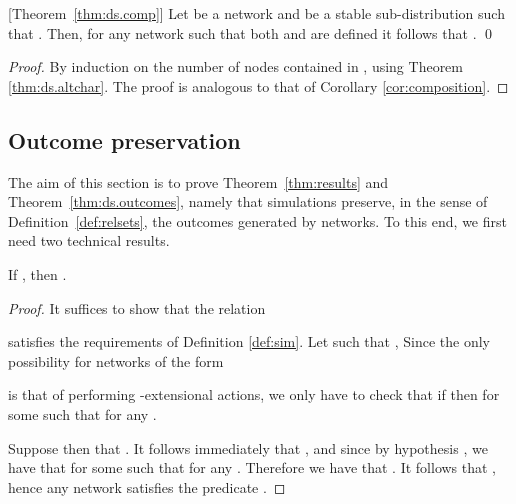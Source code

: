 \documentclass{LMCS}
\begin{document}
\begin{cor}
\label{cor:ds.comp}[Theorem~\ref{thm:ds.comp}]
Let  be a network and  be a stable sub-distribution 
such that . Then, for any network  such 
that both  and  are defined 
it follows that .
\qed
\end{cor}
\begin{proof}
By induction on the number of nodes contained in 
, using Theorem 
\ref{thm:ds.altchar}. The proof is analogous to that of Corollary \ref{cor:composition}.
\end{proof}



\subsection{Outcome preservation}
\label{sec:technical.result.pres}

The aim of this section is to prove Theorem~\ref{thm:results} and 
Theorem~\ref{thm:ds.outcomes}, namely 
that simulations preserve, in the sense of Definition~\ref{def:relsets}, 
the outcomes  generated by networks.
To this end, we first need two technical results.

\begin{lem}
\label{lem:sim.closure}
If , then .
\end{lem}

\begin{proof}
It suffices to show that the relation 

satisfies the requirements of Definition \ref{def:sim}.
Let  such that , 
Since the only possibility for networks of the form 
 
is that of performing -extensional actions, we only have 
to check that if  then 
 for some  
such that  for any . 

Suppose then that . It follows 
immediately that , and since 
by hypothesis , we have that  for some  such that 
 for any . 
Therefore we have that . 
It follows that , hence any network  satisfies the predicate .
\end{proof} 
\end{document}
